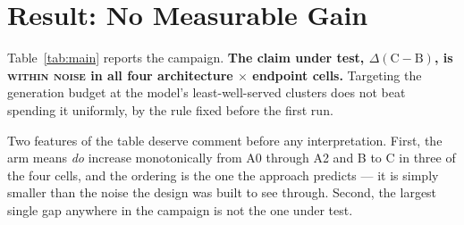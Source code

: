 \documentclass{article}
\begin{document}
\section{Result: No Measurable Gain}
\label{sec:null}

Table~\ref{tab:main} reports the campaign. \textbf{The claim under test,
$\Delta(\mathrm{C}-\mathrm{B})$, is \textsc{within noise} in all four
architecture $\times$ endpoint cells.} Targeting the generation budget at the
model's least-well-served clusters does not beat spending it uniformly, by the
rule fixed before the first run.

Two features of the table deserve comment before any interpretation. First, the
arm means \emph{do} increase monotonically from A0 through A2 and B to C in
three of the four cells, and the ordering is the one the approach predicts --- it
is simply smaller than the noise the design was built to see through. Second,
the largest single gap anywhere in the campaign is not the one under test.
\end{document}
